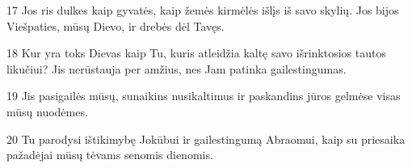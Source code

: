 \par 17 Jos ris dulkes kaip gyvatės, kaip žemės kirmėlės išlįs iš savo skylių. Jos bijos Viešpaties, mūsų Dievo, ir drebės dėl Tavęs. 
\par 18 Kur yra toks Dievas kaip Tu, kuris atleidžia kaltę savo išrinktosios tautos likučiui? Jis nerūstauja per amžius, nes Jam patinka gailestingumas. 
\par 19 Jis pasigailės mūsų, sunaikins nusikaltimus ir paskandins jūros gelmėse visas mūsų nuodėmes. 
\par 20 Tu parodysi ištikimybę Jokūbui ir gailestingumą Abraomui, kaip su priesaika pažadėjai mūsų tėvams senomis dienomis.



